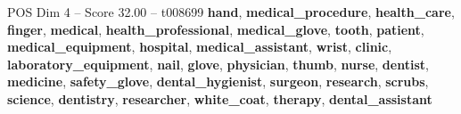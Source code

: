 \begin{textsample}{POS Dim 4 – Score 32.00 – t008699}  \label{ex:f4_pos_006}
\textbf{hand}, \textbf{medical\_procedure}, \textbf{health\_care}, \textbf{finger}, \textbf{medical}, \textbf{health\_professional}, \textbf{medical\_glove}, \textbf{tooth}, \textbf{patient}, \textbf{medical\_equipment}, \textbf{hospital}, \textbf{medical\_assistant}, \textbf{wrist}, \textbf{clinic}, \textbf{laboratory\_equipment}, \textbf{nail}, \textbf{glove}, \textbf{physician}, \textbf{thumb}, \textbf{nurse}, \textbf{dentist}, \textbf{medicine}, \textbf{safety\_glove}, \textbf{dental\_hygienist}, \textbf{surgeon}, \textbf{research}, \textbf{scrubs}, \textbf{science}, \textbf{dentistry}, \textbf{researcher}, \textbf{white\_coat}, \textbf{therapy}, \textbf{dental\_assistant}

\end{textsample}
